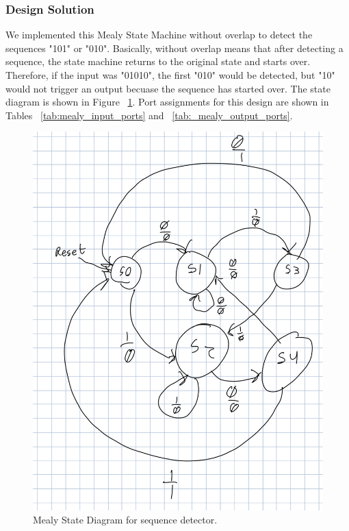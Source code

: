 \documentclass[11pt]{article}
\begin{document}
\subsubsection{Design Solution}
We implemented this Mealy State Machine without overlap to detect the sequences "101" or "010". Basically, without overlap means that after detecting a sequence, the state machine returns to the original state and starts over. Therefore, if the input was "01010", the first "010" would be detected, but "10" would not trigger an output becuase the sequence has started over. The state diagram is shown in Figure ~\ref{fig:mealy_machine}. Port assignments for this design are shown in Tables ~\ref{tab:mealy_input_ports} and ~\ref{tab:_mealy_output_ports}.

\begin{center}
\begin{figure}
	\includegraphics[width=\textwidth]{images/img2.jpg}
	\caption{\label{fig:mealy_machine}Mealy State Diagram for sequence detector.}
\end{figure}
\end{center}
\end{document}
